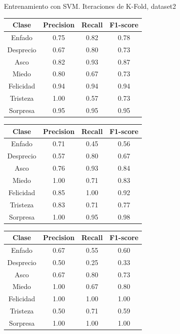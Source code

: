 \documentclass{beamer}
\begin{document}
\begin{frame}{Entrenamiento con SVM. Iteraciones de K-Fold, dataset2}
\begin{table}[h!]
\begin{minipage}{0.48\linewidth}
\begin{adjustbox}{max width=\textwidth}
\begin{tabular}{|c|c|c|c|}
\hline
\textbf{Clase} & \textbf{Precision} & \textbf{Recall} & \textbf{F1-score}\\
\hline
     Enfado & 0.75 & 0.82 & 0.78\\
     Desprecio & 0.67 & 0.80 & 0.73\\
     Asco & 0.82 & 0.93 & 0.87\\
     Miedo & 0.80 & 0.67 & 0.73\\
     Felicidad & 0.94 & 0.94 & 0.94\\
     Tristeza & 1.00 & 0.57 & 0.73\\
     Sorpresa & 0.95 & 0.95 & 0.95\\
\hline
\end{tabular}
\end{adjustbox}
\end{minipage}\hfill
\begin{minipage}{0.48\linewidth}
\centering
\begin{adjustbox}{max width=\textwidth}
\begin{tabular}{|c|c|c|c|}
\hline
\textbf{Clase} & \textbf{Precision} & \textbf{Recall} & \textbf{F1-score}\\
\hline
     Enfado & 0.71 & 0.45 & 0.56\\
     Desprecio & 0.57 & 0.80 & 0.67\\
     Asco & 0.76 & 0.93 & 0.84\\
     Miedo & 1.00 & 0.71 & 0.83\\
     Felicidad & 0.85 & 1.00 & 0.92\\
     Tristeza & 0.83 & 0.71 & 0.77\\
     Sorpresa & 1.00 & 0.95 & 0.98\\
\hline
\end{tabular}
\end{adjustbox}
\vspace{0.4cm}

\begin{adjustbox}{max width=\textwidth}
\begin{tabular}{|c|c|c|c|}
\hline
\textbf{Clase} & \textbf{Precision} & \textbf{Recall} & \textbf{F1-score}\\
\hline
     Enfado & 0.67 & 0.55 & 0.60\\
     Desprecio & 0.50 & 0.25 & 0.33\\
     Asco & 0.67 & 0.80 & 0.73\\
     Miedo & 1.00 & 0.67 & 0.80\\
     Felicidad & 1.00 & 1.00 & 1.00\\
     Tristeza & 0.50 & 0.71 & 0.59\\
     Sorpresa & 1.00 & 1.00 & 1.00\\
\hline
\end{tabular}
\end{adjustbox}
\end{minipage}
\end{table}


\end{frame}
\end{document}
